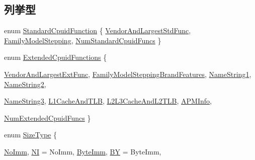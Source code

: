 \subsection*{列挙型}
\begin{DoxyCompactItemize}
\item 
enum \hyperlink{namespaceX86ISA_a7a08f3308846fdb39eae4d0fd4ecc35c}{StandardCpuidFunction} \{ \hyperlink{namespaceX86ISA_a7a08f3308846fdb39eae4d0fd4ecc35ca81d259876250b93fe759b01c0fc86f73}{VendorAndLargestStdFunc}, 
\hyperlink{namespaceX86ISA_a7a08f3308846fdb39eae4d0fd4ecc35ca2ac8b977a4729dd00761cc89e5564208}{FamilyModelStepping}, 
\hyperlink{namespaceX86ISA_a7a08f3308846fdb39eae4d0fd4ecc35cafd662c4d37d72bcbf7a3dcfead961fbf}{NumStandardCpuidFuncs}
 \}
\item 
enum \hyperlink{namespaceX86ISA_aae66b7193dbcb57cf0f4894eaec962ca}{ExtendedCpuidFunctions} \{ \par
\hyperlink{namespaceX86ISA_aae66b7193dbcb57cf0f4894eaec962caad3195ee7e9ad1f51bf58cb711e0b7d9c}{VendorAndLargestExtFunc}, 
\hyperlink{namespaceX86ISA_aae66b7193dbcb57cf0f4894eaec962caae74cb52230958be29a8324f79225d6ac}{FamilyModelSteppingBrandFeatures}, 
\hyperlink{namespaceX86ISA_aae66b7193dbcb57cf0f4894eaec962caabf4fee8486a5b66968fe32888356701a}{NameString1}, 
\hyperlink{namespaceX86ISA_aae66b7193dbcb57cf0f4894eaec962caa49eb187d44dfe9503989749f4f268e93}{NameString2}, 
\par
\hyperlink{namespaceX86ISA_aae66b7193dbcb57cf0f4894eaec962caa96e6dc59056e033d058b60891f3f18c7}{NameString3}, 
\hyperlink{namespaceX86ISA_aae66b7193dbcb57cf0f4894eaec962caa7cf1186a0d9803fbc10d5609461cf91b}{L1CacheAndTLB}, 
\hyperlink{namespaceX86ISA_aae66b7193dbcb57cf0f4894eaec962caaaad1afc9e5d3900c5d4c357674785da6}{L2L3CacheAndL2TLB}, 
\hyperlink{namespaceX86ISA_aae66b7193dbcb57cf0f4894eaec962caa0284a980841f6cf5688d4d7bbe3e5816}{APMInfo}, 
\par
\hyperlink{namespaceX86ISA_aae66b7193dbcb57cf0f4894eaec962caa37fd7159b93470b8e66784cba493b971}{NumExtendedCpuidFuncs}
 \}
\item 
enum \hyperlink{namespaceX86ISA_a483be0a6d8ef2c72a74da3529e9d1467}{SizeType} \{ \par
\hyperlink{namespaceX86ISA_a483be0a6d8ef2c72a74da3529e9d1467a9e4ac1ef10b84325ba6c6929f0070bdf}{NoImm}, 
\hyperlink{namespaceX86ISA_a483be0a6d8ef2c72a74da3529e9d1467a26d79910e64c12e79ffb16d6d4347e1c}{NI} =  NoImm, 
\hyperlink{namespaceX86ISA_a483be0a6d8ef2c72a74da3529e9d1467affaaa0fadc1cff927b6dbc7bb2c1f0c4}{ByteImm}, 
\hyperlink{namespaceX86ISA_a483be0a6d8ef2c72a74da3529e9d1467a8a7f2ff9fd0ff128eb1a14b98d95b4e6}{BY} =  ByteImm, 

\end{DoxyCompactItemize}
